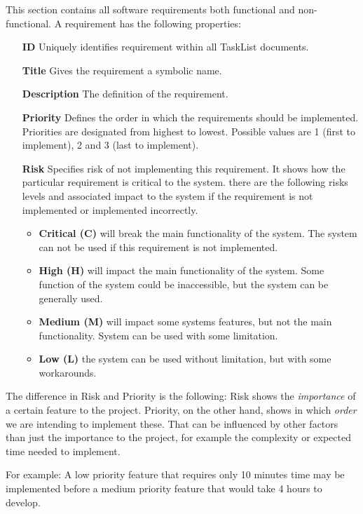 This section contains all software requirements both functional and non-functional.
A requirement has the following properties:
\begin{itemize}
	\item[\bf{ID}] Uniquely identifies requirement within all TaskList documents.
	\item[\bf{Title}] Gives the requirement a symbolic name.
	\item[\bf{Description}] The definition of the requirement.
	\item[\bf{Priority}] Defines the order in which the requirements should be implemented. Priorities are designated from highest to lowest.
          Possible values are 1 (first to implement), 2 and 3 (last to implement). 
	\item[\bf{Risk}] Specifies risk of not implementing this requirement. It shows how the particular requirement is critical to the system.
          there are the following risks levels and associated impact to the system if the requirement is not implemented or implemented incorrectly. 
		\begin{itemize}
			\item {\bf Critical (C)}  will break the main functionality of the system. The system can not be used if this requirement is not implemented.
			\item {\bf High (H)} will impact the main functionality of the system. Some function of the system could be inaccessible, but the 
			system can be generally used.
			\item {\bf Medium (M)} will impact some systems features, but not the main functionality. System can be used with some limitation.
			\item {\bf Low (L)} the system can be used without limitation, but with some workarounds.

		\end{itemize}
  \end{itemize}

  The difference in Risk and Priority is the following: Risk shows the \textit{importance} of a certain feature to the project. Priority, on the other hand, shows in which \textit{order} we are intending to implement these. That can be influenced by other factors than just the importance to the project, for example the complexity or expected time needed to implement.
  
  For example: A low priority feature that requires only 10 minutes time may be implemented before a medium priority feature that would take 4 hours to develop.


